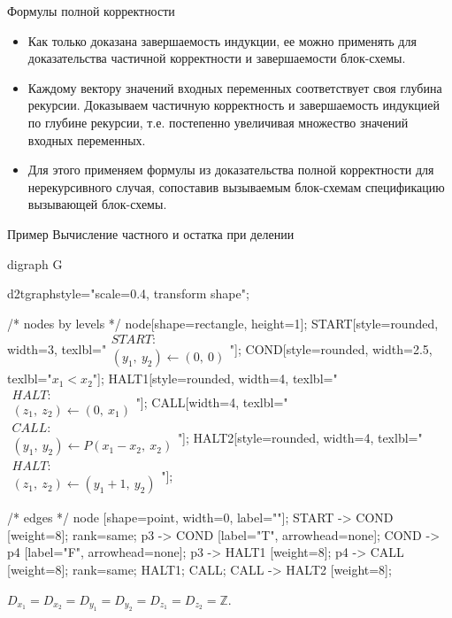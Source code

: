 \documentclass[hyperref={unicode=true}]{beamer}
\begin{document}
    \begin{frame}{Формулы полной корректности}
    \begin{itemize}
    \item Как только доказана завершаемость индукции, ее можно применять
    для доказательства частичной корректности и завершаемости блок-схемы.
    \item Каждому вектору значений входных переменных соответствует
    своя глубина рекурсии. Доказываем частичную корректность и завершаемость
    индукцией по глубине рекурсии, т.е. постепенно увеличивая множество
    значений входных переменных.
    \item Для этого применяем формулы из доказательства полной корректности
        для нерекурсивного случая, сопоставив вызываемым блок-схемам
        спецификацию вызывающей блок-схемы.
    \end{itemize}
    \end{frame}

    \begin{frame}[fragile]{Пример}
    Вычисление частного и остатка при делении
	\huge
	\begin{dot2tex}[options=-traw]
	digraph G{
		d2tgraphstyle="scale=0.4, transform shape";

		/* nodes by levels */
		node[shape=rectangle, height=1];
		START[style=rounded, width=3, texlbl="$\begin{matrix}START:\\(y_1,~y_2) \leftarrow (0,~0)\end{matrix}$"];
        COND[style=rounded, width=2.5, texlbl="$x_1 < x_2$"];
		HALT1[style=rounded, width=4, texlbl="$\begin{matrix}HALT:\\(z_1,~z_2) \leftarrow (0,~x_1)\end{matrix}$"];
		CALL[width=4, texlbl="$\begin{matrix}CALL:\\(y_1,~y_2) \leftarrow P(x_1-x_2,~x_2)\end{matrix}$"];
        HALT2[style=rounded, width=4, texlbl="$\begin{matrix}HALT:\\(z_1,~z_2) \leftarrow (y_1+1,~y_2)\end{matrix}$"];

		/* edges */
		node [shape=point, width=0, label=""];
		START -> COND [weight=8];
		{ rank=same; p3 -> COND [label="T", arrowhead=none]; COND -> p4 [label="F", arrowhead=none]; }
		p3 -> HALT1 [weight=8];
		p4 -> CALL [weight=8];
		{ rank=same; HALT1; CALL; }
		CALL -> HALT2 [weight=8];
        }
	\end{dot2tex}

	\normalsize

    $D_{x_1} = D_{x_2} = D_{y_1} = D_{y_2} = D_{z_1} = D_{z_2} = \mathbb{Z}$.
	    \end{frame}
\end{document}

